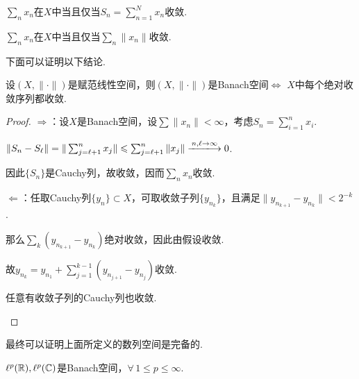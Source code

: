 \begin{definition}[级数收敛]
    $\sum_n{x_n}$在$X$中当且仅当$S_n=\sum_{n=1}^N{x_n}$收敛.\par
    $\sum_n{x_n}$在$X$中当且仅当$\sum_n\|x_n\|$收敛.\par
\end{definition}
下面可以证明以下结论.
\begin{theorem}[]
   设$(X,\|\cdot\|)$是赋范线性空间，则$(X,\|\cdot\|)$是Banach空间$\iff$ $X$中每个绝对收敛序列都收敛. 
\end{theorem}
\begin{proof}
    $\Rightarrow$：设$X$是Banach空间，设$\sum\|x_n\|<\infty$，考虑$S_n=\sum_{i=1}^n{x_i}$.\par
    $\|S_n-S_\ell\|=\|\sum_{j=\ell+1}^n{x_j}\|\leq\sum_{j=\ell+1}^n\|x_j\|\xlongrightarrow{n,\ell\to\infty} 0$.\par
    因此$\{S_n\}$是Cauchy列，故收敛，因而$\sum_n{x_n}$收敛.\par
    $\Leftarrow$：任取Cauchy列$\{y_n\}\subset X$，可取收敛子列$\{y_{n_k}\}$，且满足$\|y_{n_{k+1}}-y_{n_k}\|<2^{-k}$.\par
    那么$\sum_k\left(y_{n_{k+1}}-y_{n_k}\right)$绝对收敛，因此由假设收敛.\par
    故$y_{n_k}=y_{n_1}+\sum_{j=1}^{k-1}\left(y_{n_{j+1}}-y_{n_j}\right)$收敛.\par
    \begin{claim*}
        任意有收敛子列的Cauchy列也收敛. \qedhere
    \end{claim*}
\end{proof}
最终可以证明上面所定义的数列空间是完备的.
\begin{theorem}
    $\ell^p(\mathbb{R}),\ell^p(\mathbb{C})$是Banach空间，$\forall\, 1\leq p\leq \infty$.
\end{theorem}
